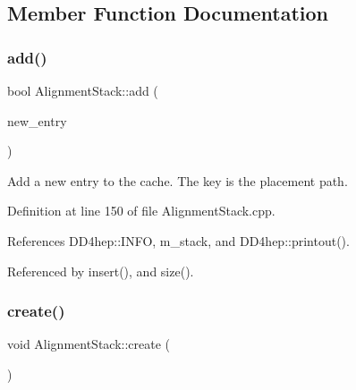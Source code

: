 \subsection{Member Function Documentation}
\hypertarget{class_d_d4hep_1_1_alignments_1_1_alignment_stack_a16d69902ec4ebd8efe8c039d033f9e7b}{}\label{class_d_d4hep_1_1_alignments_1_1_alignment_stack_a16d69902ec4ebd8efe8c039d033f9e7b} 
\subsubsection{\texorpdfstring{add()}{add()}}
{\footnotesize\ttfamily bool Alignment\+Stack\+::add (\begin{DoxyParamCaption}\item[{\hyperlink{class_d_d4hep_1_1dd4hep__ptr}{dd4hep\+\_\+ptr}$<$ \hyperlink{struct_d_d4hep_1_1_alignments_1_1_alignment_stack_1_1_stack_entry}{Stack\+Entry} $>$ \&}]{new\+\_\+entry }\end{DoxyParamCaption})}



Add a new entry to the cache. The key is the placement path. 



Definition at line 150 of file Alignment\+Stack.\+cpp.



References D\+D4hep\+::\+I\+N\+FO, m\+\_\+stack, and D\+D4hep\+::printout().



Referenced by insert(), and size().

\hypertarget{class_d_d4hep_1_1_alignments_1_1_alignment_stack_a1244b4fa8cde1f3991957f689810ae4c}{}\label{class_d_d4hep_1_1_alignments_1_1_alignment_stack_a1244b4fa8cde1f3991957f689810ae4c} 
\subsubsection{\texorpdfstring{create()}{create()}}
{\footnotesize\ttfamily void Alignment\+Stack\+::create (\begin{DoxyParamCaption}{ }\end{DoxyParamCaption})\hspace{0.3cm}{\ttfamily [static]}}



